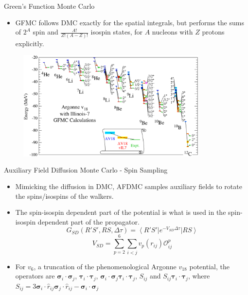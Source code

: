 \documentclass{beamer}
\newcommand{\ket}[1]{\left| #1 \right>}
\newcommand{\bra}[1]{\left< #1 \right|}
\newcommand{\Opij}{\mathcal{O}_{ij}^p}
\newcommand{\dt}{\Delta\tau}
\newcommand{\ti}{\bm{\tau}_i}
\newcommand{\tj}{\bm{\tau}_j}
\newcommand{\si}{\bm{\sigma}_i}
\newcommand{\sj}{\bm{\sigma}_j}
\begin{document}
\begin{frame}{Green's Function Monte Carlo}
\begin{itemize}
   \item GFMC follows DMC exactly for the spatial integrals, but performs the sums of $2^A$ spin and $\frac{A!}{Z!(A-Z)!}$ isospin states, for $A$ nucleons with $Z$ protons explicitly.
\end{itemize}
\begin{figure}
   \includegraphics[width=0.85\textwidth]{../figures/gfmc_energies.png}
\end{figure}
\end{frame}

\begin{frame}{Auxiliary Field Diffusion Monte Carlo - Spin Sampling}
\begin{itemize}
   \item Mimicking the diffusion in DMC, AFDMC samples auxiliary fields to rotate the spins/isospins of the walkers.
   \item The spin-isospin dependent part of the potential is what is used in the spin-isospin dependent part of the propagator.
   \begin{equation*}
      G_{SD}(R'S',RS,\dt) = \bra {R'S'}e^{-V_{SD}\dt} \ket{RS}
   \end{equation*}
   \begin{equation*}
      V_{SD} = \sum\limits_{p=2}^6\sum\limits_{i<j}v_p(r_{ij})\Opij
   \end{equation*}
   \item For $v_6$, a truncation of the phenomenological Argonne $v_{18}$ potential, the operators are $\si\cdot\sj$, $\ti\cdot\tj$, $\si\cdot\sj \ti\cdot\tj$, $S_{ij}$ and $S_{ij} \ti\cdot\tj$, where $S_{ij} = 3\si\cdot\hat{r}_{ij}\sj\cdot\hat{r}_{ij}-\si\cdot\sj$
\end{itemize}
\end{frame}
\end{document}
